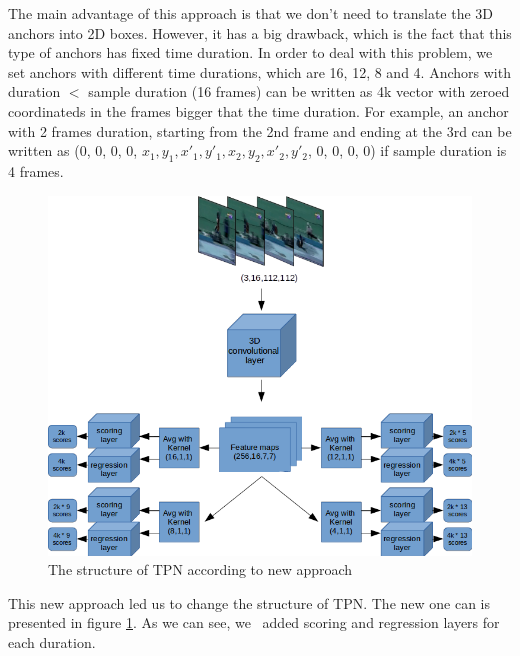 \documentclass{report}
\begin{document}
The main advantage of this approach is that we don't need to translate the 3D anchors into 2D boxes. However, it has a big drawback, which is the fact that this type of anchors
has fixed time duration. In order to deal with this problem, we set anchors with different time durations, which are 16, 12, 8 and 4. Anchors with duration $ < $
sample duration (16 frames) can be written as 4k vector with zeroed coordinateds in the frames bigger that the time duration. For example, an anchor with
2 frames duration, starting from the 2nd frame and ending at the 3rd can be written as (0, 0, 0, 0, $x_1, y_1, x'_1, y'_1, x_2, y_2, x'_2, y'_2$, 0, 0, 0, 0) if sample
duration is 4 frames. 

\begin{figure}[h]
  \centering
  \includegraphics[width=1.\textwidth]{tpn_2}
  \caption{The structure of TPN according to new approach}
  \label{fig:New_structure}
\end{figure}

This new approach led us to change the structure of TPN. The new one can is presented in figure \ref{fig:New_structure}. As we can see, we \
added scoring and regression layers for each duration.
\end{document}
